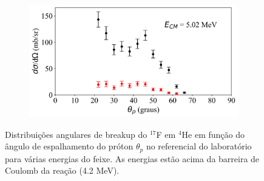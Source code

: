 \documentclass[a4paper,12pt,oneside]{book}
\begin{document}
\begin{figure}[H]
\begin{subfigure}[b]{0.48\textwidth}
        \caption{}
        \label{subfig:dist_ang_f}
    \end{subfigure}
    \begin{subfigure}[b]{0.49\textwidth}
        \centering
        \includegraphics[scale=0.38, width=1.\columnwidth]{figs/dist_angs/dist_ang_6.png}
        \caption{}
        \label{subfig:dist_ang_g}
    \end{subfigure}
\caption{Distribuições angulares de breakup do $^{17}$F em $^4$He em função do ângulo de espalhamento do próton $\theta_p$ no referencial do laboratório para várias energias do feixe. As energias estão acima da barreira de Coulomb da reação (4.2 MeV).}
\label{fig:dist_ang_acima}
\end{figure}
\end{document}
